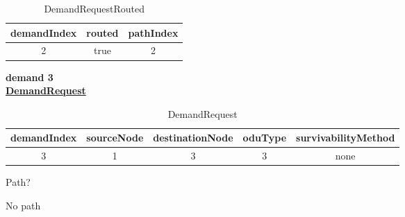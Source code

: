 \begin{table}[H]
	\centering
	\begin{tabular}{| c | c | c |}
		\hline
		\textbf{demandIndex} & \textbf{routed}  & \textbf{pathIndex}\\ \hline
		2                    & true             & 2                 \\ \hline
	\end{tabular}
	\caption{DemandRequestRouted}
	\label{demand_request_routed}
\end{table}

\textbf{demand 3}\\

\underline{\textbf{DemandRequest}}

\begin{table}[H]
	\centering
	\begin{tabular}{| c | c | c | c | c |}
		\hline
		\textbf{demandIndex} & \textbf{sourceNode} & \textbf{destinationNode} & \textbf{oduType} & \textbf{survivabilityMethod}\\ \hline
		3                    & 1                   & 3                        & 3                & none						   \\ \hline
	\end{tabular}
	\caption{DemandRequest}
	\label{demand_request}
\end{table}

Path?\\

\begin{table}[H]
	\centering
	\caption{paths}
	\label{paths}
\end{table}

No path\\

